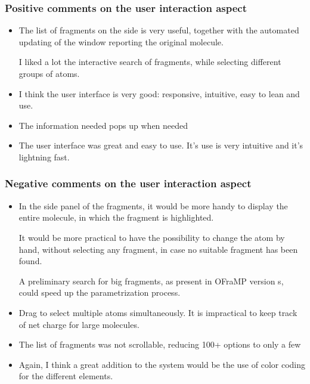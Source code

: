 \subsubsection{Positive comments on the user interaction aspect}
\begin{itemize}
\item The list of fragments on the side is very useful, together with the automated updating of the window reporting the original molecule.


I liked a lot the interactive search of fragments, while selecting different groups of atoms.

\item I think the user interface is very good: responsive, intuitive, easy to lean and use. 

\item The information needed pops up when needed

\item The user interface was great and easy to use. It's use is very intuitive and it's lightning fast.

\end{itemize}


\subsubsection{Negative comments on the user interaction aspect}
\begin{itemize}
\item In the side panel of the fragments, it would be more handy to display the entire molecule, in which the fragment is highlighted.


It would be more practical to have the possibility to change the atom by hand, without selecting any fragment, in case no suitable fragment has been found.


A preliminary search for big fragments, as present in OFraMP version s, could speed up the parametrization process.

\item Drag to select multiple atoms simultaneously.  It is impractical to keep track of net charge for large molecules. 

\item The list of fragments was not scrollable, reducing 100+ options to only a few

\item Again, I think a great addition to the system would be the use of color coding for the different elements.

\end{itemize}


